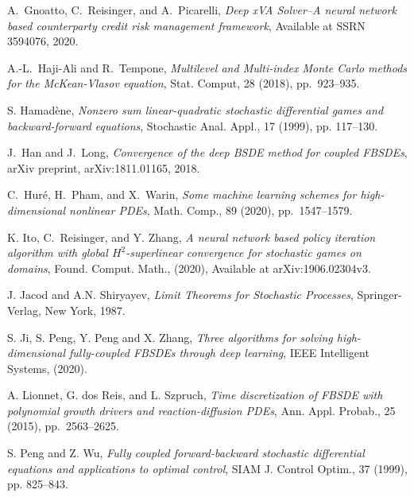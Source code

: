 \documentclass[11pt]{article}
\numberwithin{equation}{section}
\theoremstyle{definition}
\theoremstyle{remark}
\begin{document}
\begin{thebibliography}{1}
A.~Gnoatto, C.~Reisinger, and  A.~Picarelli, \emph{Deep xVA Solver--A neural network based counterparty credit risk management framework},  Available at SSRN 3594076, 2020.



A.-L.\ Haji-Ali and R.\ Tempone, 
\emph{Multilevel and Multi-index Monte Carlo methods for the McKean-Vlasov equation}, 
Stat. Comput, 28 (2018),  pp.~923--935.  

S. Hamad\`{e}ne, \emph{Nonzero sum linear-quadratic stochastic differential games and backward-forward
equations}, Stochastic Anal. Appl., 17 (1999), pp. 117--130.


 J.~Han and J.~Long, \emph{Convergence of the deep BSDE method for coupled FBSDEs},
 arXiv preprint,  arXiv:1811.01165, 2018.




C.~Hur\'{e}, H.~Pham,  and X.~Warin, \emph{Some machine learning schemes for high-dimensional
nonlinear PDEs}, Math. Comp., 89 (2020), pp.~1547--1579.

%

K. Ito, C.~Reisinger, and Y. Zhang, \emph{A neural network based policy iteration algorithm with
global $H^2$-superlinear convergence for stochastic games on domains}, 
 Found. Comput. Math., (2020),
 Available at arXiv:1906.02304v3.


J. Jacod and A.N. Shiryayev, \emph{Limit Theorems for Stochastic Processes}, Springer-Verlag, New
York, 1987.

S. Ji, S. Peng, Y. Peng and X. Zhang, \emph{Three algorithms for solving high-dimensional fully-coupled FBSDEs through deep learning}, IEEE Intelligent Systems, (2020).

A. Lionnet, G. dos Reis, and L. Szpruch, \emph{Time discretization of FBSDE with polynomial growth drivers and reaction-diffusion PDEs},  Ann. Appl. Probab.,  25  (2015), pp.~2563--2625.



S. Peng and Z. Wu, \emph{Fully coupled forward-backward stochastic differential equations and
applications to optimal control}, SIAM J. Control Optim., 37 (1999), pp. 825--843.


\end{thebibliography}
\end{document}
